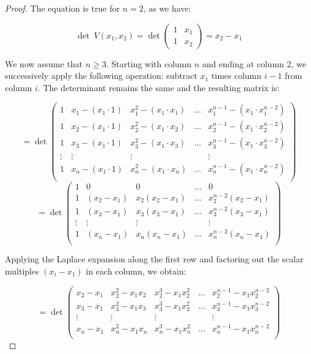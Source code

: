 \documentclass{article}
\theoremstyle{definition}
\begin{document}
\begin{proof}

The equation is true for $n = 2$, as we have:

$$
\det~V(x_1, x_2) = \det
\begin{pmatrix}
    1 & x_1\\
    1 & x_2
\end{pmatrix}
= x_2 - x_1
$$

We now assume that $n \ge 3$. Starting with column $n$ and ending at column $2$, we successively apply the following operation: subtract $x_1$ times column $i-1$ from column $i$. The determinant remains the same and the resulting matrix is:

$$
= \det
\begin{pmatrix}
    1 & x_1-(x_1 \cdot 1) & x_1^2 - (x_1 \cdot x_1) & \ldots & x_1^{n-1} - (x_1 \cdot x_1^{n-2}) \\
    1 & x_2-(x_1 \cdot 1) & x_2^2 - (x_1 \cdot x_2) & \ldots & x_2^{n-1} - (x_1 \cdot x_2^{n-2}) \\
    1 & x_3-(x_1 \cdot 1) & x_3^2 - (x_1 \cdot x_3) & \ldots & x_3^{n-1} - (x_1 \cdot x_3^{n-2}) \\
    \vdots & \vdots & \vdots &  & \vdots\\
    1 & x_n-(x_1 \cdot 1) & x_n^2 - (x_1 \cdot x_n) & \ldots & x_n^{n-1} - (x_1 \cdot x_n^{n-2}) \\
\end{pmatrix}
$$
$$
= \det
\begin{pmatrix}
    1      & 0           & 0              & \ldots & 0 \\
    1      & (x_2 - x_1) & x_2(x_2 - x_1) & \ldots & x_2^{n-2}(x_2 - x_1) \\
    1      & (x_3 - x_1) & x_3(x_3 - x_1) & \ldots & x_3^{n-2}(x_3 - x_1) \\
    \vdots & \vdots      & \vdots         &        & \vdots \\
    1      & (x_n - x_1) & x_n(x_n - x_1) & \ldots & x_n^{n-2}(x_n - x_1) \\
\end{pmatrix}
$$

Applying the Laplace expansion along the first row and factoring out the scalar multiples $(x_i - x_1)$ in each column, we obtain: 

$$
= \det
\begin{pmatrix}
    x_2-x_1 & x_2^2 - x_1 x_2 & x_2^3 - x_1 x_2^2 & \ldots & x_2^{n-1} - x_1 x_2^{n-2} \\
    x_3-x_1 & x_3^2 - x_1 x_3 & x_3^3 - x_1 x_3^2 & \ldots & x_3^{n-1} - x_1 x_3^{n-2} \\
    \vdots & \vdots & \vdots &  & \vdots\\
    x_n-x_1 & x_n^2 - x_1 x_n & x_n^3 - x_1 x_n^2 & \ldots & x_n^{n-1} - x_1 x_n^{n-2} \\
\end{pmatrix}
$$


\end{proof}
\end{document}
